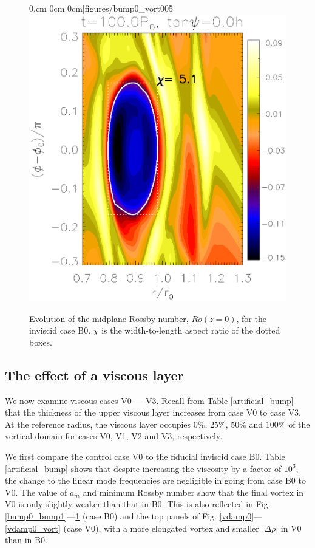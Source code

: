 \begin{figure}
     0.cm 0cm
     0cm]{figures/bump0_vort005}\includegraphics[scale=.27,clip=true,clip=true,trim=2.3cm
     0.cm 0cm
     0cm]{figures/bump0_vort010}
   \caption{Evolution of the midplane Rossby number, $Ro(z=0)$, for
     the inviscid case B0. $\chi$ is the
     width-to-length aspect ratio of the dotted boxes. 
     \label{bump0_bump1_vort}}
\end{figure}



\subsection{The effect of a viscous layer}
We now examine viscous cases V0 --- V3. Recall  
from Table \ref{artificial_bump} that the 
thickness of the upper viscous layer increases from case V0 to case
V3. At the reference radius, the viscous layer occupies
$0\%,\,25\%,\,50\%$ and $100\%$ of the vertical domain for cases V0, 
V1, V2 and V3, respectively.   

We first compare the control case V0 to the fiducial
inviscid case B0. Table \ref{artificial_bump} shows that despite
increasing the viscosity by a factor of $10^3$, the change to the
linear mode frequencies are negligible in going from case B0 to
V0. The value of $a_m$ and minimum Rossby number show that the final
vortex in V0 is only slightly weaker than that in B0. This is also
reflected in  Fig. \ref{bump0_bump1}---\ref{bump0_bump1_vort} (case B0) and the top panels of
Fig. \ref{vdamp0}---\ref{vdamp0_vort} (case V0), with a more elongated
vortex and smaller $|\Delta\rho|$ in V0 than in B0. 


